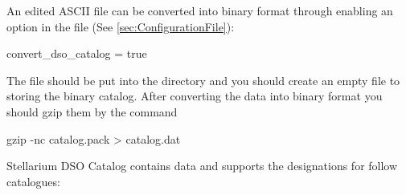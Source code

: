 An edited ASCII file can be converted into binary format through enabling an option in the file  (See \ref{sec:ConfigurationFile}):
\begin{configfile}
[devel]
convert_dso_catalog = true
\end{configfile}

The file  should be put into the directory
 and you should create an empty 
file  to storing the binary catalog. After converting the data into binary format 
you should gzip them by the command 
\begin{commands}
gzip -nc catalog.pack > catalog.dat
\end{commands}

Stellarium DSO Catalog contains data and supports the designations for
follow catalogues:

